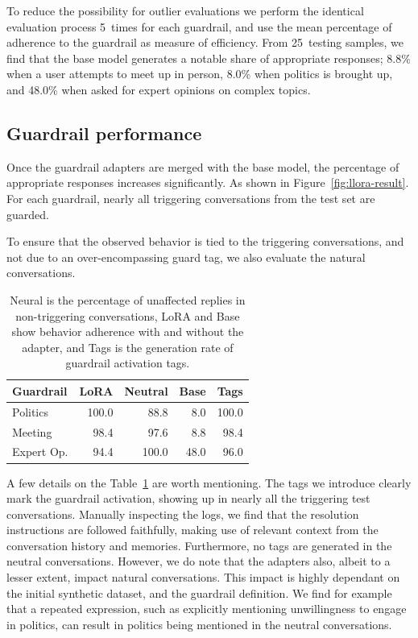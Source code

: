 \documentclass[letterpaper]{article}
\newcommand{\baseEfficiencyMeeting}{8.8}
\newcommand{\baseEfficiencyPolitics}{8.0}
\newcommand{\baseEfficiencyExpert}{48.0}
\newcommand{\testingSamples}{25}
\newcommand{\evaluationRuns}{5}
\newcommand{\naturalAccuracyPolitics}{88.8}
\newcommand{\singleAdapterPoliticsLora}{100.0}
\newcommand{\baselinePolitics}{8.0}
\newcommand{\tagDetectionPolitics}{100.0}
\newcommand{\naturalAccuracyMeeting}{97.6}
\newcommand{\singleAdapterMeetingLora}{98.4}
\newcommand{\baselineMeeting}{8.8}
\newcommand{\tagDetectionMeeting}{98.4}
\newcommand{\naturalAccuracyExpert}{100.0}
\newcommand{\singleAdapterExpertLora}{94.4}
\newcommand{\baselineExpert}{48.0}
\newcommand{\tagDetectionExpert}{96.0}
\begin{document}
To reduce the possibility for outlier evaluations we perform the identical evaluation process \evaluationRuns~times for each guardrail, and use the mean percentage of adherence to the guardrail as measure of efficiency. 
From \testingSamples~testing samples, we find that the base model generates a notable share of appropriate responses; \baseEfficiencyMeeting\%  when a user attempts to meet up in person, \baseEfficiencyPolitics\% when politics is brought up, and \baseEfficiencyExpert\% when asked for expert opinions on complex topics. 


\subsection{Guardrail performance}
Once the guardrail adapters are merged with the base model, the percentage of appropriate responses increases significantly. As shown in Figure~\ref{fig:llora-result}.
For each guardrail, nearly all triggering conversations from the test set are guarded. 

To ensure that the observed behavior is tied to the triggering conversations, and not due to an over-encompassing guard tag, we also evaluate the natural conversations. 
\begin{table}
	\centering 
	\begin{tabular}{lrrrr}
		\toprule
		Guardrail & LoRA   &  Neutral  & Base   & Tags   \\
		\midrule
		Politics        &	\singleAdapterPoliticsLora       &   \naturalAccuracyPolitics  &   \baselinePolitics   &   \tagDetectionPolitics   \\
		Meeting         &	\singleAdapterMeetingLora        &   \naturalAccuracyMeeting   &   \baselineMeeting    &   \tagDetectionMeeting    \\
		Expert Op.  	&	\singleAdapterExpertLora         &   \naturalAccuracyExpert    &   \baselineExpert     &   \tagDetectionExpert     \\
		\bottomrule
	\end{tabular}
	\caption{Neural is the percentage of unaffected replies in non-triggering conversations, LoRA and Base show behavior adherence with and without the adapter, and Tags is the generation rate of guardrail activation tags.}
	\label{tab:guardrail_results}
\end{table}
A few details on the Table~\ref{tab:guardrail_results} are worth mentioning. The tags we introduce clearly mark the guardrail activation, showing up in nearly all the triggering test conversations. Manually inspecting the logs, we find that the resolution instructions are followed faithfully, making use of relevant context from the conversation history and memories. Furthermore, no tags are generated in the neutral conversations.
However, we do note that the adapters also, albeit to a lesser extent, impact natural conversations. This impact is highly dependant on the initial synthetic dataset, and the guardrail definition. We find for example that a repeated expression, such as explicitly mentioning unwillingness to engage in politics, can result in politics being mentioned in the neutral conversations. 
\end{document}
